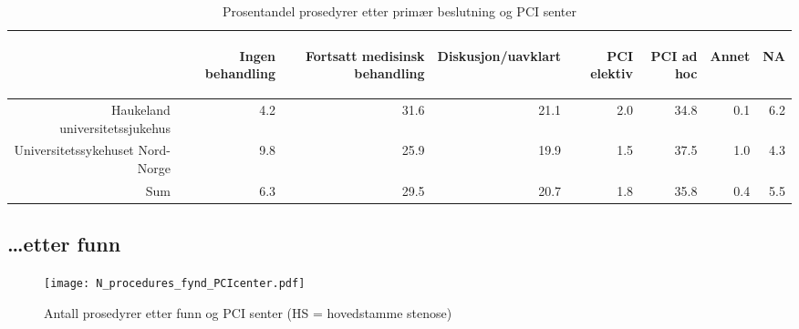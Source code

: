 \documentclass[norsk, a4paper]{report}
\begin{document}
\begin{tiny}
\begin{table}[ht]
\centering
\begin{tabular}{rrrrrrrr}
  \toprule
 & \begin{sideways} Ingen behandling \end{sideways} & \begin{sideways} Fortsatt medisinsk behandling \end{sideways} & \begin{sideways} Diskusjon/uavklart \end{sideways} & \begin{sideways} PCI elektiv \end{sideways} & \begin{sideways} PCI ad hoc \end{sideways} & \begin{sideways} Annet \end{sideways} & \begin{sideways} NA \end{sideways} \\ 
  \midrule
Haukeland universitetssjukehus & 4.2 & 31.6 & 21.1 & 2.0 & 34.8 & 0.1 & 6.2 \\ 
  Universitetssykehuset Nord-Norge & 9.8 & 25.9 & 19.9 & 1.5 & 37.5 & 1.0 & 4.3 \\ 
  Sum & 6.3 & 29.5 & 20.7 & 1.8 & 35.8 & 0.4 & 5.5 \\ 
   \bottomrule
\end{tabular}
\caption{Prosentandel prosedyrer etter primær beslutning og PCI senter} 
\end{table}\end{tiny}



\clearpage
\subsection{\ldots etter funn}



\begin{figure}[ht]
  \centering
\texttt{[image: N\_procedures\_fynd\_PCIcenter.pdf]}  \caption{Antall prosedyrer etter funn og PCI senter (HS = hovedstamme stenose)}
\end{figure}
\end{document}
